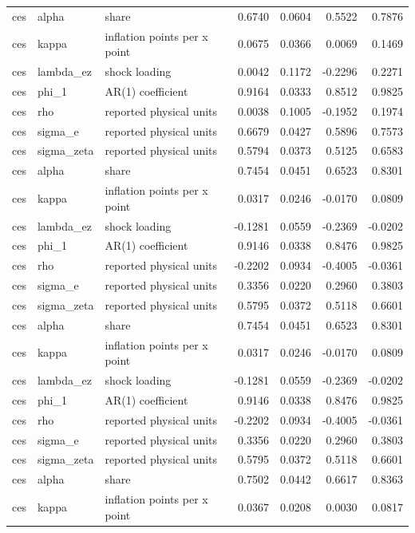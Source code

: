 \begin{tabular}{lllrrrr}
ces & alpha & share & 0.6740 & 0.0604 & 0.5522 & 0.7876 \\
ces & kappa & inflation points per x point & 0.0675 & 0.0366 & 0.0069 & 0.1469 \\
ces & lambda\_ez & shock loading & 0.0042 & 0.1172 & -0.2296 & 0.2271 \\
ces & phi\_1 & AR(1) coefficient & 0.9164 & 0.0333 & 0.8512 & 0.9825 \\
ces & rho & reported physical units & 0.0038 & 0.1005 & -0.1952 & 0.1974 \\
ces & sigma\_e & reported physical units & 0.6679 & 0.0427 & 0.5896 & 0.7573 \\
ces & sigma\_zeta & reported physical units & 0.5794 & 0.0373 & 0.5125 & 0.6583 \\
ces & alpha & share & 0.7454 & 0.0451 & 0.6523 & 0.8301 \\
ces & kappa & inflation points per x point & 0.0317 & 0.0246 & -0.0170 & 0.0809 \\
ces & lambda\_ez & shock loading & -0.1281 & 0.0559 & -0.2369 & -0.0202 \\
ces & phi\_1 & AR(1) coefficient & 0.9146 & 0.0338 & 0.8476 & 0.9825 \\
ces & rho & reported physical units & -0.2202 & 0.0934 & -0.4005 & -0.0361 \\
ces & sigma\_e & reported physical units & 0.3356 & 0.0220 & 0.2960 & 0.3803 \\
ces & sigma\_zeta & reported physical units & 0.5795 & 0.0372 & 0.5118 & 0.6601 \\
ces & alpha & share & 0.7454 & 0.0451 & 0.6523 & 0.8301 \\
ces & kappa & inflation points per x point & 0.0317 & 0.0246 & -0.0170 & 0.0809 \\
ces & lambda\_ez & shock loading & -0.1281 & 0.0559 & -0.2369 & -0.0202 \\
ces & phi\_1 & AR(1) coefficient & 0.9146 & 0.0338 & 0.8476 & 0.9825 \\
ces & rho & reported physical units & -0.2202 & 0.0934 & -0.4005 & -0.0361 \\
ces & sigma\_e & reported physical units & 0.3356 & 0.0220 & 0.2960 & 0.3803 \\
ces & sigma\_zeta & reported physical units & 0.5795 & 0.0372 & 0.5118 & 0.6601 \\
ces & alpha & share & 0.7502 & 0.0442 & 0.6617 & 0.8363 \\
ces & kappa & inflation points per x point & 0.0367 & 0.0208 & 0.0030 & 0.0817 \\

\end{tabular}
